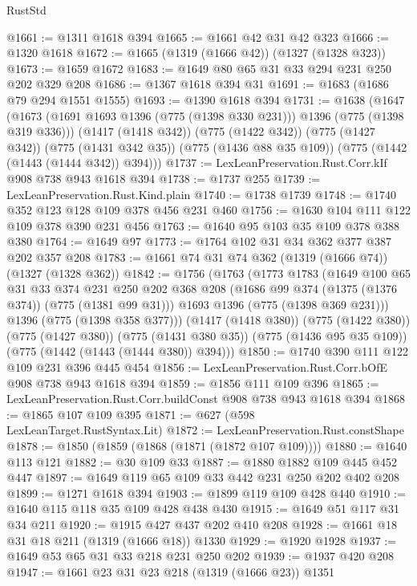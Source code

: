 \begin{lexlean}{RustStd}
\begin{coremodule}
@1661 := @1311 @1618 @394
@1665 := @1661 @42 @31 @42 @323
@1666 := @1320 @1618
@1672 := @1665 (@1319 (@1666 @42)) (@1327 (@1328 @323))
@1673 := @1659 @1672
@1683 := @1649 @80 @65 @31 @33 @294 @231 @250 @202 @329 @208
@1686 := @1367 @1618 @394 @31
@1691 := @1683 (@1686 @79 @294 @1551 @1555)
@1693 := @1390 @1618 @394
@1731 := @1638
    (@1647
      (@1673 (@1691 @1693 @1396 (@775 (@1398 @330 @231))) @1396 (@775 (@1398 @319 @336)))
      (@1417 (@1418 @342))
      (@775 (@1422 @342))
      (@775 (@1427 @342))
      (@775 (@1431 @342 @35))
      (@775 (@1436 @88 @35 @109))
      (@775 (@1442 (@1443 (@1444 @342)) @394)))
@1737 := LexLeanPreservation.Rust.Corr.kIf @908 @738 @943 @1618 @394
@1738 := @1737 @255
@1739 := LexLeanPreservation.Rust.Kind.plain
@1740 := @1738 @1739
@1748 := @1740 @352 @123 @128 @109 @378 @456 @231 @460
@1756 := @1630 @104 @111 @122 @109 @378 @390 @231 @456
@1763 := @1640 @95 @103 @35 @109 @378 @388 @380
@1764 := @1649 @97
@1773 := @1764 @102 @31 @34 @362 @377 @387 @202 @357 @208
@1783 := @1661 @74 @31 @74 @362 (@1319 (@1666 @74)) (@1327 (@1328 @362))
@1842 := @1756
    (@1763
      (@1773
        @1783
        (@1649
          @100
          @65
          @31
          @33
          @374
          @231
          @250
          @202
          @368
          @208
          (@1686 @99 @374 (@1375 (@1376 @374)) (@775 (@1381 @99 @31)))
          @1693
          @1396
          (@775 (@1398 @369 @231)))
        @1396
        (@775 (@1398 @358 @377)))
      (@1417 (@1418 @380))
      (@775 (@1422 @380))
      (@775 (@1427 @380))
      (@775 (@1431 @380 @35))
      (@775 (@1436 @95 @35 @109))
      (@775 (@1442 (@1443 (@1444 @380)) @394)))
@1850 := @1740 @390 @111 @122 @109 @231 @396 @445 @454
@1856 := LexLeanPreservation.Rust.Corr.bOfE @908 @738 @943 @1618 @394
@1859 := @1856 @111 @109 @396
@1865 := LexLeanPreservation.Rust.Corr.buildConst @908 @738 @943 @1618 @394
@1868 := @1865 @107 @109 @395
@1871 := @627 (@598 LexLeanTarget.RustSyntax.Lit)
@1872 := LexLeanPreservation.Rust.constShape
@1878 := @1850 (@1859 (@1868 (@1871 (@1872 @107 @109))))
@1880 := @1640 @113 @121
@1882 := @30 @109 @33
@1887 := @1880 @1882 @109 @445 @452 @447
@1897 := @1649 @119 @65 @109 @33 @442 @231 @250 @202 @402 @208
@1899 := @1271 @1618 @394
@1903 := @1899 @119 @109 @428 @440
@1910 := @1640 @115 @118 @35 @109 @428 @438 @430
@1915 := @1649 @51 @117 @31 @34 @211
@1920 := @1915 @427 @437 @202 @410 @208
@1928 := @1661 @18 @31 @18 @211 (@1319 (@1666 @18)) @1330
@1929 := @1920 @1928
@1937 := @1649 @53 @65 @31 @33 @218 @231 @250 @202
@1939 := @1937 @420 @208
@1947 := @1661 @23 @31 @23 @218 (@1319 (@1666 @23)) @1351

\end{coremodule}
\end{lexlean}
